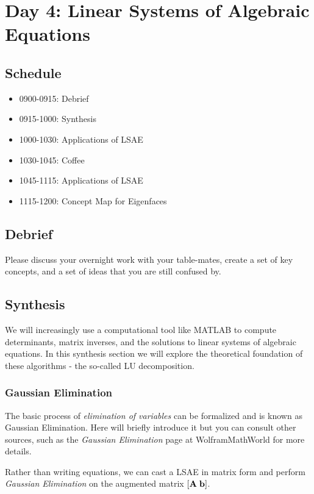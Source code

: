 \chapter{Day 4: Linear Systems of Algebraic Equations}

\section{Schedule}
\begin{itemize}
\item 0900-0915: Debrief
\item 0915-1000: Synthesis
\item 1000-1030: Applications of LSAE
\item 1030-1045: Coffee
\item 1045-1115: Applications of LSAE 
\item 1115-1200: Concept Map for Eigenfaces
\end{itemize}

\section{Debrief}
\bi
\item Please discuss your overnight work with your table-mates, create a set of key concepts, and a set of ideas that you are still confused by.
\ei

\section{Synthesis}

We will increasingly use a computational tool like MATLAB to compute determinants, matrix inverses, and the solutions to linear systems of algebraic equations. In this synthesis section we will explore the theoretical foundation of these algorithms - the so-called LU decomposition. 

\subsection{Gaussian Elimination}

The basic process of \textit{ elimination of variables} can be formalized and is known as Gaussian Elimination. Here will briefly introduce it but you can consult other sources, such as the \textit{Gaussian Elimination} page at WolframMathWorld for more details.

Rather than writing equations, we can cast a LSAE in matrix form and perform \textit{Gaussian Elimination} on the augmented matrix $[\mathbf{A} \; \mathbf{b}]$. 

